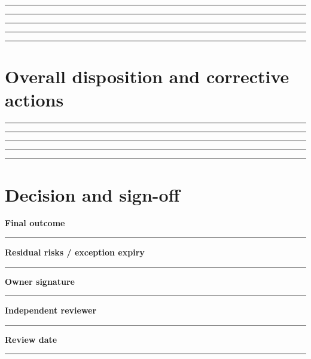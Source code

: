 \documentclass[11pt,letterpaper]{article}
\begin{document}
\vspace{2mm}
\noindent\rule{0.93\linewidth}{0.4pt}\par\vspace{13pt}
\noindent\rule{0.93\linewidth}{0.4pt}\par\vspace{13pt}
\noindent\rule{0.93\linewidth}{0.4pt}\par\vspace{13pt}
\noindent\rule{0.93\linewidth}{0.4pt}\par\vspace{13pt}
\noindent\rule{0.93\linewidth}{0.4pt}\par\vspace{13pt}
\section{Overall disposition and corrective actions}
\vspace{2mm}
\noindent\rule{0.93\linewidth}{0.4pt}\par\vspace{13pt}
\noindent\rule{0.93\linewidth}{0.4pt}\par\vspace{13pt}
\noindent\rule{0.93\linewidth}{0.4pt}\par\vspace{13pt}
\noindent\rule{0.93\linewidth}{0.4pt}\par\vspace{13pt}
\noindent\rule{0.93\linewidth}{0.4pt}\par\vspace{13pt}
\section{Decision and sign-off}
\noindent\textbf{Final outcome}\par\nobreak\vspace{6pt}\noindent\rule{0.93\linewidth}{0.4pt}\par\vspace{14pt}
\noindent\textbf{Residual risks / exception expiry}\par\nobreak\vspace{6pt}\noindent\rule{0.93\linewidth}{0.4pt}\par\vspace{14pt}
\noindent\textbf{Owner signature}\par\nobreak\vspace{6pt}\noindent\rule{0.93\linewidth}{0.4pt}\par\vspace{14pt}
\noindent\textbf{Independent reviewer}\par\nobreak\vspace{6pt}\noindent\rule{0.93\linewidth}{0.4pt}\par\vspace{14pt}
\noindent\textbf{Review date}\par\nobreak\vspace{6pt}\noindent\rule{0.93\linewidth}{0.4pt}\par\vspace{14pt}
\end{document}
